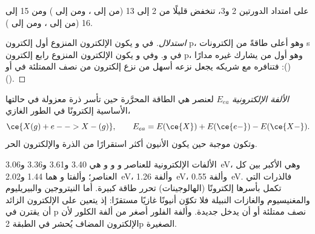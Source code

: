 \begin{proposition}\label{prop:b1:periodicity:ie-anomalies}
على امتداد الدورتين 2 و3، تنخفض  قليلًا من
 2 إلى  13 (من  إلى ، ومن  إلى ) ومن
 15 إلى  16 (من  إلى ، ومن  إلى ).
\end{proposition}

\begin{proof}[استدلال]
في  و يكون الإلكترون المنزوع أول إلكترون p،
وهو أعلى طاقةً من إلكترونات s في  و. وفي 
و يكون الإلكترون المنزوع رابع إلكترون p، وهو أول من
يشارك غيره مدارًا (): فتنافره مع شريكه يجعل
نزعه أسهل من نزع إلكترون من  نصف الممتلئة في
 أو  ().
\end{proof}

\begin{definition}\label{def:b1:periodicity:electron-affinity}
\emph{الألفة الإلكترونية} $E_{ea}$
لعنصر هي الطاقة المحرَّرة حين تأسر ذرة معزولة في حالتها الأساسية
إلكترونًا في الطور الغازي،
\[
  \ce{X(g) + e- -> X-(g)}, \qquad E_{ea} = E(\ce{X}) + E(\ce{e-}) - E(\ce{X-}) .
\]
وتكون موجبة حين يكون الأنيون أكثر استقرارًا من الذرة والإلكترون
الحر.
\end{definition}

\begin{example}\label{ex:b1:periodicity:ea}
الألفات الإلكترونية للعناصر  و و و هي 3.40
و3.61 و3.36 و\qty{3.06}{eV}، وهي الأكبر بين كل العناصر؛ وألفتا
 و هما 1.44 و\qty{2.02}{eV}، وألفة  \qty{1.26}{eV}،
وألفة  \qty{0.55}{eV}. فالذرات التي تكمل  بأسرها
إلكترونًا (الهالوجينات) تحرر طاقة كبيرة. أما النيتروجين والبيريليوم
والمغنيسيوم والغازات النبيلة فلا تكوّن أنيونًا غازيًا مستقرًا: إذ يتعين على
الإلكترون الزائد أن يقترن في  p نصف ممتلئة أو أن يدخل 
جديدة. وألفة الفلور أصغر من ألفة الكلور لأن الإلكترون المضاف يُحشر
في الطبقة 2p الصغيرة.
\end{example}

